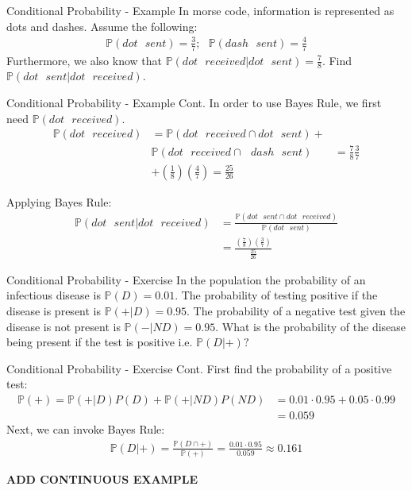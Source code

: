 \documentclass{beamer}
\begin{document}
\begin{frame}{Conditional Probability - Example}
In morse code, information is represented as dots and dashes. Assume the following:
\begin{align*}
\mathbb{P}(dot\>\>\> sent) = \frac{3}{7} ;\>\>\>
\mathbb{P}(dash \>\>\> sent) = \frac{4}{7}
\end{align*}
Furthermore, we also know that $\mathbb{P}(dot\>\>\> received | dot \>\>\> sent) = \frac{7}{8}$. Find $\mathbb{P}(dot\>\>\> sent| dot \>\>\> received)$. 
\end{frame}


\begin{frame}{Conditional Probability - Example Cont.}
In order to use Bayes Rule, we first need $\mathbb{P}(dot \>\>\> received)$.
\begin{align*}
\mathbb{P}(dot \>\>\> received) &= \mathbb{P}(dot \>\>\> received \cap dot \>\>\> sent) + \\ 
&\mathbb{P}(dot \>\>\> received \cap \>\>\> dash \>\>\> sent) &= \frac{7}{8}\frac{3}{7} \\
&+ \left(\frac{1}{8}\right)\left(\frac{4}{7}\right) = \frac{25}{26}
\end{align*}

Applying Bayes Rule:
\begin{align*}
\mathbb{P}(dot\>\>\> sent| dot \>\>\> received)  &= \frac{\mathbb{P}(dot \>\>\> sent \cap dot \>\>\> received)}{\mathbb{P}(dot \>\>\> sent)} \\
&= \frac{\left(\frac{7}{8}\right)\left(\frac{3}{7}\right)}{\frac{25}{26}}
\end{align*}
\end{frame}

\begin{frame}{Conditional Probability - Exercise}
In the population the probability of an infectious disease is $\mathbb{P}(D) = 0.01$. The probability of testing positive if the disease is present is $\mathbb{P}(+|D) = 0.95$. The probability of a negative test given the disease is not present is $\mathbb{P}(-|ND) = 0.95$. What is the probability of the disease being present if the test is positive i.e. $\mathbb{P}(D|+)?$
\end{frame}

\begin{frame}{Conditional Probability - Exercise Cont.}
First find the probability of a positive test:
\begin{align*}
\mathbb{P}(+) = \mathbb{P}(+|D)P(D) + \mathbb{P}(+|ND)P(ND) &= 0.01 \cdot 0.95 + 0.05 \cdot 0.99\\
 &= 0.059
\end{align*}
Next, we can invoke Bayes Rule:
\begin{align*}
\mathbb{P}(D|+) = \frac{\mathbb{P}(D \cap +)}{\mathbb{P}(+)} = \frac{0.01\cdot 0.95}{0.059} \approx 0.161
\end{align*}

\textbf{ADD CONTINUOUS EXAMPLE}
\end{frame}
\end{document}
